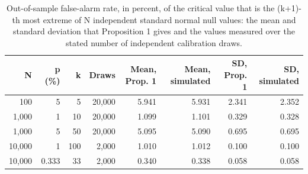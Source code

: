\begin{table}[htbp]
\centering
\footnotesize
\caption{Out-of-sample false-alarm rate, in percent, of the critical value that is the (k+1)-th most extreme of N independent standard normal null values: the mean and standard deviation that Proposition 1 gives and the values measured over the stated number of independent calibration draws.}
\label{tab:theory-size}
\begin{tabular}{rrrrrrrr}
\toprule
N & p (\%) & k & Draws & Mean, Prop. 1 & Mean, simulated & SD, Prop. 1 & SD, simulated \\
\midrule
100 & 5 & 5 & 20,000 & 5.941 & 5.931 & 2.341 & 2.352 \\
1,000 & 1 & 10 & 20,000 & 1.099 & 1.101 & 0.329 & 0.328 \\
1,000 & 5 & 50 & 20,000 & 5.095 & 5.090 & 0.695 & 0.695 \\
10,000 & 1 & 100 & 2,000 & 1.010 & 1.012 & 0.100 & 0.100 \\
10,000 & 0.333 & 33 & 2,000 & 0.340 & 0.338 & 0.058 & 0.058 \\
\bottomrule
\end{tabular}
\end{table}
